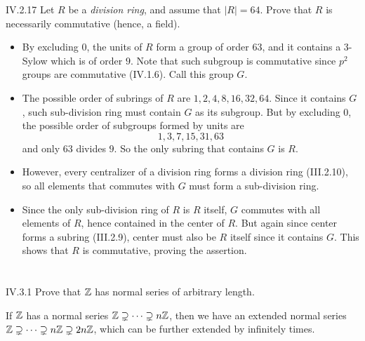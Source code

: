 \begin{problem}{IV.2.17}
Let $R$ be a \emph{division ring}, and assume that $|R| = 64$. Prove that $R$ is necessarily commutative (hence, a field).
\end{problem}
\begin{pf}
\begin{itemize}
\setlength\itemsep{0pt}
\item By excluding $0$, the units of $R$ form a group of order 63, and it contains a $3$-Sylow which is of order $9$. Note that such subgroup is commutative since $p^2$ groups are commutative (IV.1.6). Call this group $G$.
\item The possible order of subrings of $R$ are $1,2,4,8,16,32,64$. Since it contains $G$, such sub-division ring must contain $G$ as its subgroup. But by excluding $0$, the possible order of subgroups formed by units are 
\[
1,3,7,15,31,63
\]
and only $63$ divides $9$. So the only subring that contains $G$ is $R$.
\item However, every centralizer of a division ring forms a division ring (III.2.10), so all elements that commutes with $G$ must form a sub-division ring.
\item Since the only sub-division ring of $R$ is $R$ itself, $G$ commutes with all elements of $R$, hence contained in the center of $R$. But again since center forms a subring (III.2.9), center must also be $R$ itself since it contains $G$. This shows that $R$ is commutative, proving the assertion. 
\end{itemize}
\end{pf}

\section{}

\begin{problem}{IV.3.1}
Prove that $\mathbb{Z}$ has normal series of arbitrary length.
\end{problem}
\begin{pf}
If $\mathbb{Z}$ has a normal series $\mathbb{Z} \supsetneq \cdots \supsetneq n\mathbb{Z}$, then we have an extended normal series $\mathbb{Z} \supsetneq \cdots \supsetneq n\mathbb{Z} \supsetneq 2n\mathbb{Z}$, which can be further extended by infinitely times.
\end{pf}

